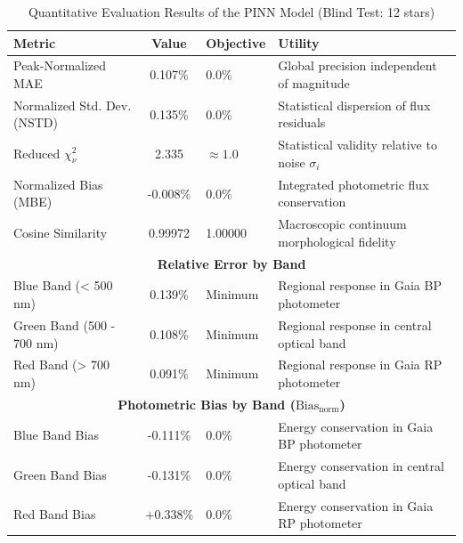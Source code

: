 
\begin{table}[htpb]
\centering
\caption{Quantitative Evaluation Results of the PINN Model (Blind Test: 12 stars)}
\label{tab:pinn_evaluation}
\begin{tabular}{lcll}
\hline
\textbf{Metric} & \textbf{Value} & \textbf{Objective} & \textbf{Utility} \\
\hline
Peak-Normalized MAE & 0.107\% & 0.0\% & Global precision independent of magnitude \\
Normalized Std. Dev. (NSTD) & 0.135\% & 0.0\% & Statistical dispersion of flux residuals \\
Reduced $\chi^2_\nu$ & 2.335 & $\approx 1.0$ & Statistical validity relative to noise $\sigma_i$ \\
Normalized Bias (MBE) & -0.008\% & 0.0\% & Integrated photometric flux conservation \\
Cosine Similarity & 0.99972 & 1.00000 & Macroscopic continuum morphological fidelity \\
\hline
\multicolumn{4}{c}{\textbf{Relative Error by Band}} \\
\hline
Blue Band (< 500 nm) & 0.139\% & Minimum & Regional response in Gaia BP photometer \\
Green Band (500 - 700 nm) & 0.108\% & Minimum & Regional response in central optical band \\
Red Band (> 700 nm) & 0.091\% & Minimum & Regional response in Gaia RP photometer \\
\hline
\multicolumn{4}{c}{\textbf{Photometric Bias by Band ($\text{Bias}_{\text{norm}}$)}} \\
\hline
Blue Band Bias & -0.111\% & 0.0\% & Energy conservation in Gaia BP photometer \\
Green Band Bias & -0.131\% & 0.0\% & Energy conservation in central optical band \\
Red Band Bias & +0.338\% & 0.0\% & Energy conservation in Gaia RP photometer \\
\hline
\end{tabular}
\end{table}
